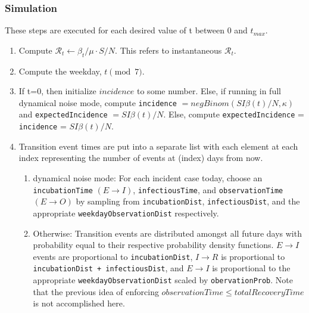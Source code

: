 \documentclass{article}
\newcommand{\nR}{\mathcal{R}}
\newcommand{\code}[1]{\texttt{#1}}
\begin{document}
\subsubsection{Simulation}
These steps are executed for each desired value of t between 0 and $t_{max}$.
\begin{enumerate}
    \item Compute $\nR_t \gets \beta_t/\mu \cdot S/N$. This refers to instantaneous $\nR_t$.
    
    \item Compute the weekday, $t \pmod 7$.
    
    \item If t=0, then initialize $incidence$ to some number. Else, if running in full dynamical noise mode, compute \code{incidence} $= negBinom(SI\beta(t)/N, \kappa)$ and \code{expectedIncidence} $= SI\beta(t)/N$. Else, compute \code{expectedIncidence} = \code{incidence} = $SI\beta(t)/N$.
    
    \item Transition event times are put into a separate list with each element at each index representing the number of events at (index) days from now. 
        \begin{enumerate}
            \item dynamical noise mode: For each incident case today, choose an \linebreak \code{incubationTime} $(E \rightarrow I)$, \code{infectiousTime}, and \code{observationTime} $(E \rightarrow O)$ by sampling from \code{incubationDist}, \code{infectiousDist}, and the appropriate \code{weekdayObservationDist} respectively. 
            
            \item Otherwise: Transition events are distributed amongst all future days with probability equal to their respective probability density functions. $E \rightarrow I$ events are proportional to \code{incubationDist}, $I \rightarrow R$ is proportional to \code{incubationDist + infectiousDist}, and $E \rightarrow I$ is proportional to the appropriate \code{weekdayObservationDist} scaled by \code{obervationProb}. Note that the previous idea of enforcing \linebreak $observationTime \leq totalRecoveryTime$ is not accomplished here.

        \end{enumerate}


\end{enumerate}
\end{document}

